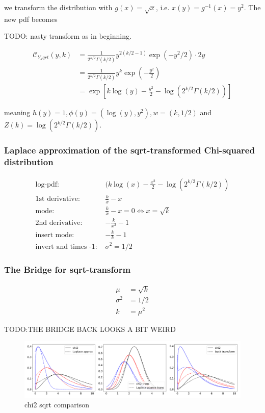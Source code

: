 we transform the distribution with $g(x) = \sqrt{x}$, i.e. $x(y) = g^{-1}(x) = y^2$. The new pdf becomes

TODO: nasty transform as in beginning.

\begin{align}
\mathcal{C}_{Y_sqrt}(y,k) &= \frac{1}{2^{k/2}\Gamma(k/2)}  y^{2(k/2 -1)} \exp(-y^2/2) \cdot 2y \\
		 &= \frac{1}{2^{k/2}\Gamma(k/2)}  y^{k} \exp(-\frac{y^2}{2}) \\
		 &= \exp \left[k\log(y) - \frac{y^2}{2} - \log(2^{k/2}\Gamma(k/2))\right]
\end{align}


meaning $h(y) = 1, \phi(y)=(\log(y), y^2), w=(k, 1/2)$ and $Z(k) =  \log(2^{k/2}\Gamma(k/2))$. 

\subsubsection{Laplace approximation of the sqrt-transformed Chi-squared distribution}

\begin{align*}
\text{log-pdf: } &(k\log(x) - \frac{x^2}{2} - \log(2^{k/2}\Gamma(k/2)) \\
\text{1st derivative: }&  \frac{k}{x} -x \\
\text{mode: }& \frac{k}{x} -x = 0 \Leftrightarrow x = \sqrt{k}\\
\text{2nd derivative: }&  -\frac{k}{x^2} - 1\\
\text{insert mode: }& -\frac{k}{k}-1\\
\text{invert and times -1: }&\sigma^2 = 1/2
\end{align*}

\subsubsection{The Bridge for sqrt-transform}

\begin{align}
\mu &= \sqrt{k} \\
\sigma^2 &= 1/2 \\
k &= \mu^2
\end{align}

TODO:THE BRIDGE BACK LOOKS A BIT WEIRD\\

\begin{figure}[!htb]
	\centering
	\includegraphics[width=\textwidth]{figures/chi2_playground_sqrt.pdf}
	\caption{chi2 sqrt comparison}
	\label{fig:chi2_sqrt_comparison}
\end{figure}